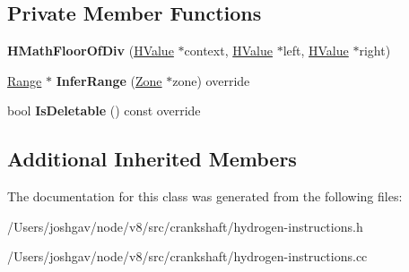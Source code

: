 \subsection*{Private Member Functions}
\begin{DoxyCompactItemize}
\item 
{\bfseries H\+Math\+Floor\+Of\+Div} (\hyperlink{classv8_1_1internal_1_1_h_value}{H\+Value} $\ast$context, \hyperlink{classv8_1_1internal_1_1_h_value}{H\+Value} $\ast$left, \hyperlink{classv8_1_1internal_1_1_h_value}{H\+Value} $\ast$right)\hypertarget{classv8_1_1internal_1_1_h_math_floor_of_div_aa8eed99d941e80ae29cfa390fb7bb3af}{}\label{classv8_1_1internal_1_1_h_math_floor_of_div_aa8eed99d941e80ae29cfa390fb7bb3af}

\item 
\hyperlink{classv8_1_1internal_1_1_range}{Range} $\ast$ {\bfseries Infer\+Range} (\hyperlink{classv8_1_1internal_1_1_zone}{Zone} $\ast$zone) override\hypertarget{classv8_1_1internal_1_1_h_math_floor_of_div_a4b301b58b18a3fc8556a1b4370035eac}{}\label{classv8_1_1internal_1_1_h_math_floor_of_div_a4b301b58b18a3fc8556a1b4370035eac}

\item 
bool {\bfseries Is\+Deletable} () const  override\hypertarget{classv8_1_1internal_1_1_h_math_floor_of_div_ad39457d43754bfa50dc3653c243171f6}{}\label{classv8_1_1internal_1_1_h_math_floor_of_div_ad39457d43754bfa50dc3653c243171f6}

\end{DoxyCompactItemize}
\subsection*{Additional Inherited Members}


The documentation for this class was generated from the following files\+:\begin{DoxyCompactItemize}
\item 
/\+Users/joshgav/node/v8/src/crankshaft/hydrogen-\/instructions.\+h\item 
/\+Users/joshgav/node/v8/src/crankshaft/hydrogen-\/instructions.\+cc\end{DoxyCompactItemize}
